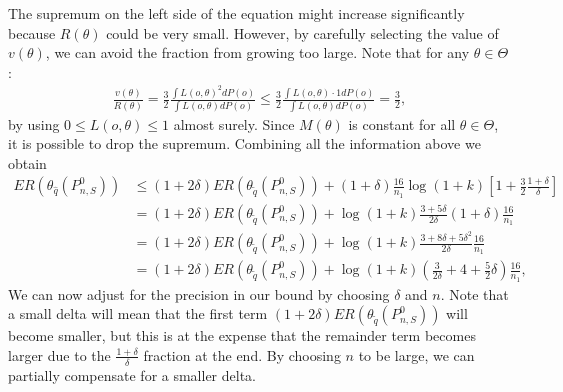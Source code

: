 \documentclass[11pt, a4paper]{article}
\theoremstyle{definition}
\theoremstyle{remark}
\newcommand{\q}{q}
\newcommand{\btheta}{\theta}
\begin{document}
The supremum on the left side of the equation might increase significantly because $R(\btheta)$ could be very small. However, by carefully selecting the value of $v(\btheta)$, we can avoid the fraction from growing too large. Note that for any $ \btheta \in \Theta $:
\begin{align*}
    \frac{v(\btheta)}{R(\btheta)} = \frac{3}{2} \frac{\int L(o, \btheta)^2 d P(o)}{\int L(o, \btheta) dP(o)  } \leq \frac{3}{2} \frac{\int L(o, \btheta) \cdot 1 dP(o) }{\int L(o, \btheta) dP(o) } = \frac{3}{2},
\end{align*}
by using $ 0 \leq L(o, \btheta) \leq 1 $ almost surely. Since $ M(\btheta) $ is constant for all $ \btheta \in \Theta $, it is possible to drop the supremum. Combining all the information above we obtain 
\begin{align*}
   ER(\btheta_{\hat{\q}}(P_{n, S}^{0})) &\leq(1 + 2 \delta) ER(\btheta_{ \tilde{\q}}(P_{n,S}^{0})) +(1 + \delta) \frac{16}{n_1} \log (1 +k) \left[ 1 + \frac{3}{2} \frac{1 + \delta}{\delta}\right]\\
                                        &= (1 + 2 \delta) ER(\btheta_{ \tilde{\q}}(P_{n,S}^{0})) +\log (1 +k) \frac{3 + 5\delta}{2\delta}(1 + \delta) \frac{16}{n_1} \\
                                        &= (1 + 2 \delta) ER(\btheta_{ \tilde{\q}}(P_{n,S}^{0})) +\log (1 +k) \frac{3 + 8\delta + 5 \delta^2}{2\delta}\frac{16}{n_1} \\\
                                        &= (1 + 2 \delta) ER(\btheta_{ \tilde{\q}}(P_{n,S}^{0})) +\log (1 +k) \left( \frac{3}{2\delta} + 4 + \frac{5}{2} \delta \right) \frac{16}{n_1},
\end{align*}
We can now adjust for the precision in our bound by choosing $ \delta $ and $ n $. Note that a small delta will mean that the first term $ (1 + 2 \delta) E R(\btheta_{ \tilde{q} }(P_{n, S}^{0})) $ will become smaller, but this is at the expense that the remainder term becomes larger due to the $ \frac{1 + \delta}{ \delta} $ fraction at the end. By choosing $ n $ to be large, we can partially compensate for a smaller delta.
\end{document}
